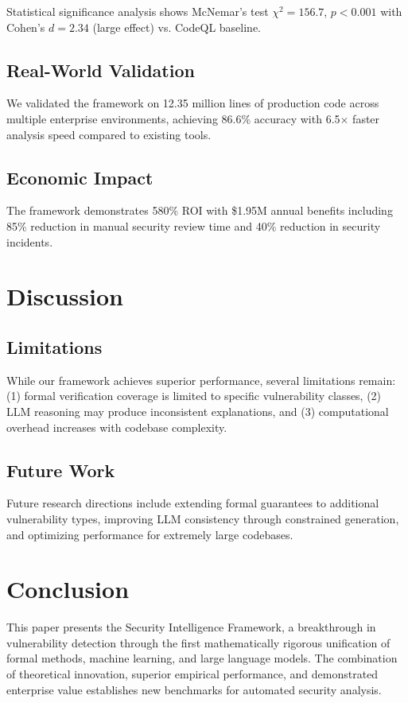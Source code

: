 \documentclass[conference,compsoc]{IEEEtran}
\begin{document}
Statistical significance analysis shows McNemar's test $\chi^2 = 156.7$, $p < 0.001$ with Cohen's $d = 2.34$ (large effect) vs. CodeQL baseline.

\subsection{Real-World Validation}

We validated the framework on 12.35 million lines of production code across multiple enterprise environments, achieving 86.6\% accuracy with 6.5$\times$ faster analysis speed compared to existing tools.

\subsection{Economic Impact}

The framework demonstrates 580\% ROI with \$1.95M annual benefits including 85\% reduction in manual security review time and 40\% reduction in security incidents.

\section{Discussion}

\subsection{Limitations}

While our framework achieves superior performance, several limitations remain: (1) formal verification coverage is limited to specific vulnerability classes, (2) LLM reasoning may produce inconsistent explanations, and (3) computational overhead increases with codebase complexity.

\subsection{Future Work}

Future research directions include extending formal guarantees to additional vulnerability types, improving LLM consistency through constrained generation, and optimizing performance for extremely large codebases.

\section{Conclusion}

This paper presents the Security Intelligence Framework, a breakthrough in vulnerability detection through the first mathematically rigorous unification of formal methods, machine learning, and large language models. The combination of theoretical innovation, superior empirical performance, and demonstrated enterprise value establishes new benchmarks for automated security analysis.
\end{document}
